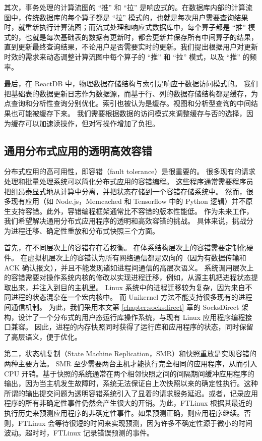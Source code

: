 其次，事务处理的计算流图的 ``推'' 和 ``拉'' 是响应式的。在数据库内部的计算流图中，传统数据库的每个算子都是 ``拉'' 模式的，也就是每次用户需要查询结果时，就重新执行计算流图；而流式处理和响应式数据库中，每个算子都是 ``推'' 模式的，也就是每次基础表的数据有更新时，都会更新并保存所有中间算子的结果，直到更新最终查询结果，不论用户是否需要实时的更新。我们提出根据用户对更新时效的需求来动态调整计算流图中每个算子的 ``推'' 和 ``拉'' 模式，以及 ``推'' 的频率。

最后，在 ReactDB 中，物理数据存储结构与索引是响应于数据访问模式的。
我们把基础表的数据更新日志作为数据源，而基于行、列的数据存储结构都是缓存，为点查询和分析性查询分别优化。索引也被认为是缓存。视图和分析型查询的中间结果也可能被缓存下来。
我们需要根据数据的访问模式来调整缓存与否的选择，因为缓存可以加速读操作，但对写操作增加了负担。

\subsection{通用分布式应用的透明高效容错}

分布式应用的高可用性，即容错（fault tolerance）是很重要的。
很多现有的请求处理和批量处理系统可以简化分布式应用的容错编程。
这些程序通常需要程序员把组昂泰显式地从计算中分离，并把状态存储到一个容错存储系统中。
然而，很多现有应用（如 Node.js，Memcached 和 Tensorflow 中的 Python 逻辑）并不原生支持容错。此外，容错编程框架通常比不容错的版本性能低。
作为未来工作，我们希望解决通用分布式应用程序的透明和高效容错的挑战。
具体来说，挑战分为进程迁移、确定性重放和分布式快照三个方面。

首先，在不同层次上的容错存在着权衡。
在体系结构层次上的容错需要定制化硬件。
在虚拟机层次上的容错认为所有网络通信都是双向的（因为有数据传输和 ACK 确认报文），并且不能发现诸如进程间通信的高层次语义。
系统调用层次上的容错需要对操作系统内核的修改以实现进程迁移，例如，从源主机把进程状态提取出来，并注入到目的主机里。
Linux 系统中的进程迁移较为复杂，因为来自不同进程的状态混杂在一个宏内核中。
而 Unikernel 方法不能支持很多现有的进程间通信机制。
为此，我们采用本文第 \ref{chapter:socksdirect} 章的 SocksDirect 架构，设计了一个分布式的用户态运行库操作系统，与现有 Linux 应用程序编程接口兼容。
因此，进程的内存快照同时获得了运行库和应用程序的状态，同时保留了高层语义，便于优化。

第二，状态机复制（State Machine Replication，SMR）和快照重放是实现容错的两种主要方法。 SMR 至少需要两台主机才能执行完全相同的应用程序，从而引入 CPU 开销。基于快照的系统通常在两个相邻快照之间的间隔期间缓冲应用程序的输出，因为当主机发生故障时，系统无法保证自上次快照以来的确定性执行。这种所谓的输出提交问题为透明容错系统引入了显着的请求服务延迟。或者，记录应用程序的所有非确定性事件仍然会产生很大的开销。为此，FTLinux 根据其最近的执行历史来预测应用程序的非确定性事件。如果预测正确，则应用程序继续。否则，FTLinux 会等待很短的时间来实现预测，因为许多不确定性源于微小的时间波动。超时时，FTLinux 记录错误预测的事件。

